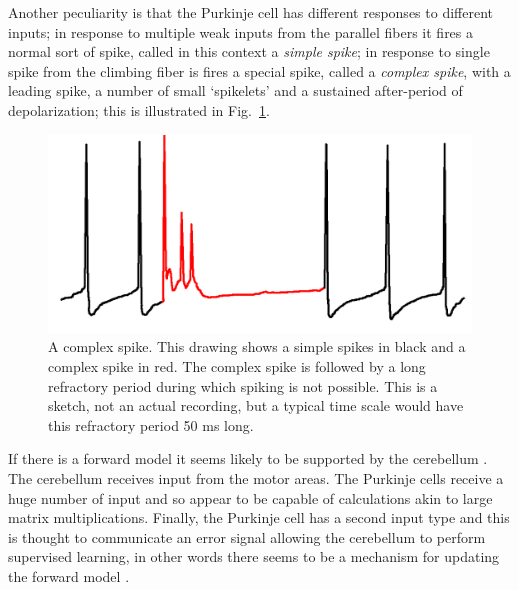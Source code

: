 \documentclass[12pt]{article}
\begin{document}
Another peculiarity is that the Purkinje cell has different responses
to different inputs; in response to multiple weak inputs from the
parallel fibers it fires a normal sort of spike, called in this
context a \textsl{simple spike}; in response to single spike from the
climbing fiber is fires a special spike, called a \textsl{complex
  spike}, with a leading spike, a number of small \lq{}spikelets\rq{}
and a sustained after-period of depolarization; this is illustrated in
Fig.~\ref{fig:spikes}.

\begin{figure}
\begin{center}
\includegraphics[width=8.cm]{complex_spike.png}
\end{center}
\caption{A complex spike. This drawing shows a simple spikes in black
  and a complex spike in red. The complex spike is followed by a long
  refractory period during which spiking is not possible. This is a
  sketch, not an actual recording, but a typical time scale would have
  this refractory period 50 ms long.\label{fig:spikes}}
\end{figure}

If there is a forward model it seems likely to be supported by the
cerebellum \citep{GaoEtAl1996}. The cerebellum receives input from the motor areas. The
Purkinje cells receive a huge number of input and so appear to be
capable of calculations akin to large matrix multiplications. Finally,
the Purkinje cell has a second input type and this is thought to
communicate an error signal allowing the cerebellum to perform
supervised learning, in other words there seems to be a mechanism for
updating the forward model \citep{Marr1969,Albus1971}.



 {}
\end{document}
